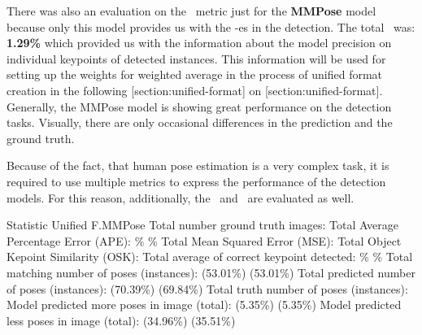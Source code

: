 
There was also an evaluation on the \APE\ metric just for the {\bf MMPose} model because only this model provides us with the \BBOX\--es in the detection. The total \APE\ was: {\bf 1.29\%} which provided us with the information about the model precision on individual keypoints of detected instances. This information will be used for setting up the weights for weighted average in the process of unified format creation in the following [section:unified-format] on [section:unified-format]. Generally, the MMPose model is showing great performance on the detection tasks. Visually, there are only occasional differences in the prediction and the ground truth.

Because of the fact, that human pose estimation is a very complex task, it is required to use multiple metrics to express the performance of the detection models. For this reason, additionally, the \MSE\ and \OKS\ are evaluated as well.

    \setupTABLE[r][1][style=bold]
    \setupTABLE[c][each][offset=3dd]
    \setupTABLE[frame=off]
    \setupTABLE[r][1][topframe=on,bottomframe=on]
    \setupTABLE[c][each][leftframe=on]
    \setupTABLE[c][1][leftframe=off]
    \setupTABLE[c][2,3][align=middle]
    \bTR\bTD Statistic                                   \eTD\bTD    Unified F.\eTD\bTD      MMPose\eTD\eTR
    \bTR\bTD Total number ground truth images:           \eTD{} \eTD{} \eTD\eTR
    \bTR\bTD Total Average Percentage Error (APE):       \eTD{}\% \eTD{}\% \eTD\eTR
    \bTR\bTD Total Mean Squared Error (MSE):             \eTD{} \eTD{} \eTD\eTR
    \bTR\bTD Total Object Kepoint Similarity (OSK):      \eTD{} \eTD{} \eTD\eTR
    \bTR\bTD Total average of correct keypoint detected: \eTD{}\% \eTD{}\% \eTD\eTR
    \bTR\bTD Total matching number of poses (instances): \eTD{} (53.01\%) \eTD{} (53.01\%) \eTD\eTR
    \bTR\bTD Total predicted number of poses (instances):\eTD{} (70.39\%) \eTD{} (69.84\%) \eTD\eTR
    \bTR\bTD Total truth number of poses (instances):    \eTD{} \eTD{} \eTD\eTR
    \bTR\bTD Model predicted more poses in image (total):\eTD{} (5.35\%)\eTD{} (5.35\%) \eTD\eTR
    \bTR\bTD Model predicted less poses in image (total):\eTD{} (34.96\%)\eTD{} (35.51\%) \eTD\eTR

